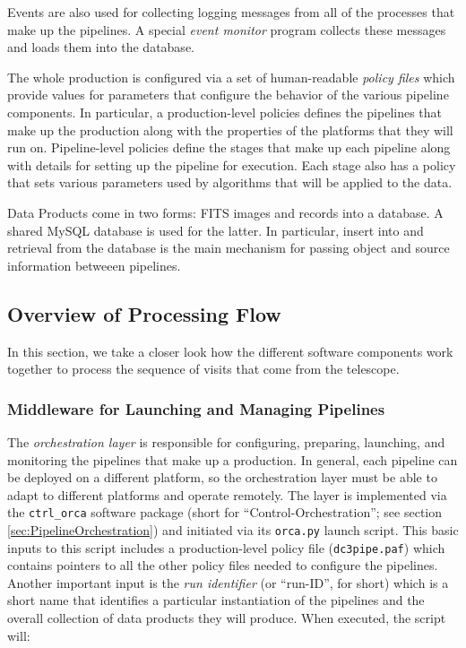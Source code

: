 Events are also used for collecting logging messages from all of the
processes that make up the pipelines.  A special \textit{event
monitor} program collects these messages and loads them into the
database.  

The whole production is configured via a set of human-readable
\textit{policy files} which provide values for parameters that
configure the behavior of the various pipeline components.  In
particular, a production-level policies defines the pipelines that
make up the production along with the properties of the platforms that
they will run on.  Pipeline-level policies define the stages that make
up each pipeline along with details for setting up the pipeline for
execution.  Each stage also has a policy that sets various parameters
used by algorithms that will be applied to the data.  

Data Products come in two forms: FITS images and records into a
database.  A shared MySQL database is used for the latter.  In
particular, insert into and retrieval from the database is the main
mechanism for passing object and source information betweeen
pipelines.  

\subsection{Overview of Processing Flow}

In this section, we take a closer look how the different software
components work together to process the sequence of visits that come
from the telescope.  

\subsubsection{Middleware for Launching and Managing Pipelines}

The \textit{orchestration layer} is responsible for configuring,
preparing, launching, and monitoring the pipelines that make up a
production.  In general, each pipeline can be deployed on a different
platform, so the orchestration layer must be able to adapt to
different platforms and operate remotely.  The layer is implemented
via the \texttt{ctrl\_orca} software package (short for
``Control-Orchestration''; see section \ref{sec:PipelineOrchestration})
and initiated via its \texttt{orca.py} launch script.  This basic
inputs to this script includes a production-level policy file
(\texttt{dc3pipe.paf}) which contains pointers to all the other policy
files needed to configure the pipelines.  Another important input is
the \textit{run identifier} (or ``run-ID'', for short) which is a
short name that identifies a particular instantiation of the pipelines
and the overall collection of data products they will produce.  When
executed, the script will:  

